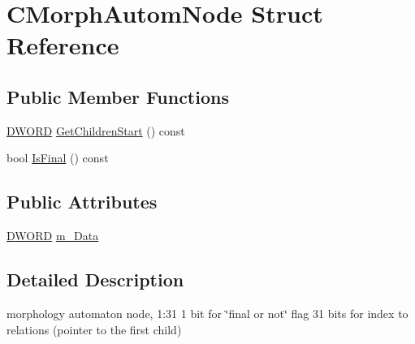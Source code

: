 \hypertarget{structCMorphAutomNode}{\section{C\-Morph\-Autom\-Node Struct Reference}
\label{structCMorphAutomNode}
}
\subsection*{Public Member Functions}
\begin{DoxyCompactItemize}
\item 
\hyperlink{sphinxstd_8h_a798af1e30bc65f319c1a246cecf59e39}{D\-W\-O\-R\-D} \hyperlink{structCMorphAutomNode_a65095c3f757312876ff1152da1f633ec}{Get\-Children\-Start} () const 
\item 
bool \hyperlink{structCMorphAutomNode_a99b139e11243471b4641d3d30b51c263}{Is\-Final} () const 
\end{DoxyCompactItemize}
\subsection*{Public Attributes}
\begin{DoxyCompactItemize}
\item 
\hyperlink{sphinxstd_8h_a798af1e30bc65f319c1a246cecf59e39}{D\-W\-O\-R\-D} \hyperlink{structCMorphAutomNode_ab1f2a8e929ace249f89e8cf77527319c}{m\-\_\-\-Data}
\end{DoxyCompactItemize}


\subsection{Detailed Description}
morphology automaton node, 1\-:31 1 bit for \char`\"{}final or not\char`\"{} flag 31 bits for index to relations (pointer to the first child) 

